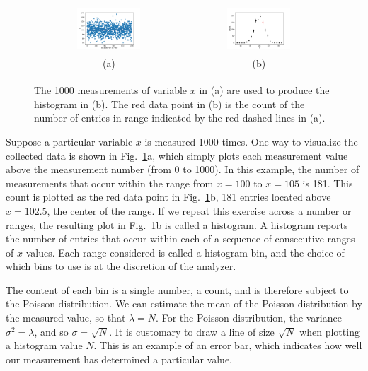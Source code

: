 \documentclass[12pt,oneside]{book}
\begin{document}
\begin{figure}[htbp]
\begin{center}
\begin{tabular}{cc}
{\includegraphics[width=0.45\textwidth]{figs/raw.pdf}} &
{\includegraphics[width=0.45\textwidth]{figs/histeg.pdf}} \\
(a) & (b) \\
\end{tabular}
\end{center}
\caption{\label{fig:histeg} The 1000 measurements of variable $x$ in (a) are used to produce the histogram in (b).  The red data point in (b) is the count of the number of entries in range indicated by the red dashed lines in (a).}
\end{figure}

Suppose a particular variable $x$ is measured 1000 times.  One way to visualize the collected data is shown in Fig.~\ref{fig:histeg}a, which simply plots each measurement value above the measurement number (from 0 to 1000).  In this example, the number of measurements that occur within the range from $x=100$ to $x=105$ is 181.  This count is plotted as the red data point in Fig.~\ref{fig:histeg}b, 181 entries located above $x=102.5$, the center of the range.  If we repeat this exercise across a number or ranges, the resulting plot in Fig.~\ref{fig:histeg}b is called a histogram.  A histogram reports the number of entries that occur within each of a sequence of consecutive ranges of $x$-values.  Each range considered is called a histogram  bin, and the choice of which bins to use is at the discretion of the analyzer.

The content of each bin is a single number, a count, and is therefore subject to the Poisson distribution.
We can estimate the mean of the Poisson distribution by the measured value, so that $\lambda = N$.
For the Poisson distribution, the variance $\sigma^2 = \lambda$, and so $\sigma = \sqrt{N}$.  It is customary to draw a line of size $\sqrt{N}$ when plotting a histogram value $N$. This is an example of an error bar, which indicates how well our measurement has determined a particular value.
\end{document}
